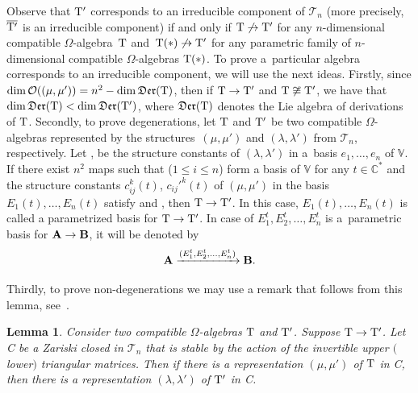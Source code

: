 \documentclass[pdftex]{sigma}
\numberwithin{equation}{section}
\newtheorem{Lemma}[Theorem]{Lemma}
\begin{document}
Observe that ${\rm T}'$ corresponds to an irreducible component of $\mathcal{T}_n$ (more precisely, $\overline{{\rm T}'}$ is an irreducible component) if and only if ${{\rm T} }\not\to {{\rm T} }'$ for any $n$-dimensional compatible $\Omega$-algebra~${\rm T}$ and~${{{\rm T}(*) }\not\to {{\rm T} }'}$ for any parametric family of $n$-dimensional compatible $\Omega$-algebras ${\rm T}(*)$. To prove a~particular algebra corresponds to an irreducible component, we will use the next ideas.
Firstly, since $\operatorname{dim}{\mathcal O}((\mu, \mu')) = n^2 - \operatorname{dim}\mathfrak{Der}({\rm T})$, then if $ {\rm T} \to {\rm T} '$ and ${\rm T} \not\cong {\rm T} '$, we have that $\operatorname{dim}\mathfrak{Der}( {\rm T} )<\operatorname{dim}\mathfrak{Der}( {\rm T} ')$, where $\mathfrak{Der}( {\rm T} )$ denotes the Lie algebra of derivations of ${\rm T} $.
Secondly, to prove degenerations, let ${{\rm T} }$ and ${{\rm T} }'$ be two compatible $\Omega$-algebras represented by the structures~$(\mu, \mu')$ and $(\lambda, \lambda')$ from ${{\mathcal T} }_n$, respectively. Let ,  be the structure constants of $(\lambda, \lambda')$ in a~basis $e_1,\dots, e_n$ of ${\mathbb V}$. If there exist $n^2$ maps  such that  ($1\leq i \leq n$) form a basis of ${\mathbb V}$ for any $t\in\mathbb{C}^*$ and the structure constants $c_{ij}^k(t)$, $c_{ij}'^k(t)$ of $(\mu, \mu')$ in the basis $E_1(t),\dots, E_n(t)$ satisfy  and , then ${{\rm T} }\to {{\rm T} }'$. In this case, $E_1(t),\dots, E_n(t)$ is called a parametrized basis for ${{\rm T} }\to {{\rm T} }'$.
In case of $E_1^t, E_2^t, \ldots, E_n^t$ is a~parametric basis for ${\bf A}\to {\bf B}$, it will be denoted by
\[
{\bf A}\xrightarrow{(E_1^t, E_2^t, \ldots, E_n^t)} {\bf B}.
\]

Thirdly, to prove non-degenerations we may use a remark that follows from this lemma, see~\cite{afm}.

\begin{Lemma} %
Consider two compatible $\Omega$-algebras ${\rm T}$ and ${\rm T}'$. Suppose ${\rm T} \to {\rm T}'$. Let C be a Zariski closed in ${\mathcal T}_n$ that is stable by the action of the invertible upper $($lower$)$ triangular matrices. Then if there is a representation $(\mu, \mu')$ of ${\rm T}$ in C, then there is a representation $(\lambda, \lambda')$ of ${\rm T}'$ in C.
\end{Lemma}
\end{document}
